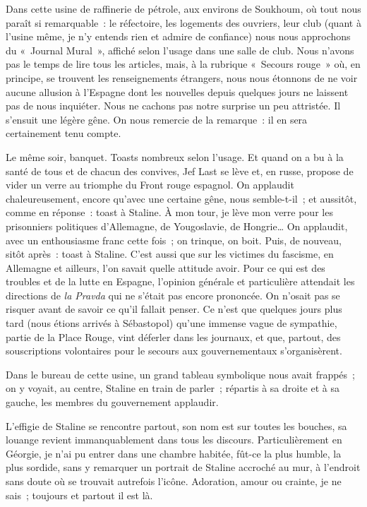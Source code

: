 \documentclass[french,twoside]{book} %
\newcommand{\astermono}{\medskip\centerline{\color{rubric}\large\selectfont{\syms ✻}}\medskip\par}%
\newcommand\chaptercont{} %
\begin{document}
\chaptercont
\noindent Dans cette usine de raffinerie de pétrole, aux environs de Soukhoum, où tout nous paraît si remarquable : le réfectoire, les logements des ouvriers, leur club (quant à l’usine même, je n’y entends rien et admire de confiance) nous nous approchons du « Journal Mural », affiché selon l’usage dans une salle de club. Nous n’avons pas le temps de lire tous les articles, mais, à la rubrique « Secours rouge » où, en principe, se trouvent les renseignements étrangers, nous nous étonnons de ne voir aucune allusion à l’Espagne dont les nouvelles depuis quelques jours ne laissent pas de nous inquiéter. Nous ne cachons pas notre surprise un peu attristée. Il s’ensuit une légère gêne. On nous remercie de la remarque : il en sera certainement tenu compte.\par
Le même soir, banquet. Toasts nombreux selon l’usage. Et quand on a bu à la santé de tous et de chacun des convives, Jef Last se lève et, en russe, propose de vider un verre au triomphe du Front rouge espagnol. On applaudit chaleureusement, encore qu’avec une certaine gêne, nous semble-t-il ; et aussitôt, comme en réponse : toast à Staline. À mon tour, je lève mon verre pour les prisonniers politiques d’Allemagne, de Yougoslavie, de Hongrie… On applaudit, avec un enthousiasme franc cette fois ; on trinque, on boit. Puis, de nouveau, sitôt après : toast à Staline. C’est aussi que sur les victimes du fascisme, en Allemagne et ailleurs, l’on savait quelle attitude avoir. Pour ce qui est des troubles et de la lutte en Espagne, l’opinion générale et particulière attendait les directions de \emph{la Pravda} qui ne s’était pas encore prononcée. On n’osait pas se risquer avant de savoir ce qu’il fallait penser. Ce n’est que quelques jours plus tard (nous étions arrivés à Sébastopol) qu’une immense vague de sympathie, partie de la Place Rouge, vint déferler dans les journaux, et que, partout, des souscriptions volontaires pour le secours aux gouvernementaux s’organisèrent.\par

\astermono

\noindent Dans le bureau de cette usine, un grand tableau symbolique nous avait frappés ; on y voyait, au centre, Staline en train de parler ; répartis à sa droite et à sa gauche, les membres du gouvernement applaudir.\par

\astermono

\noindent L’effigie de Staline se rencontre partout, son nom est sur toutes les bouches, sa louange revient immanquablement dans tous les discours. Particulièrement en Géorgie, je n’ai pu entrer dans une chambre habitée, fût-ce la plus humble, la plus sordide, sans y remarquer un portrait de Staline accroché au mur, à l’endroit sans doute où se trouvait autrefois l’icône. Adoration, amour ou crainte, je ne sais ; toujours et partout il est là.\par
\end{document}
